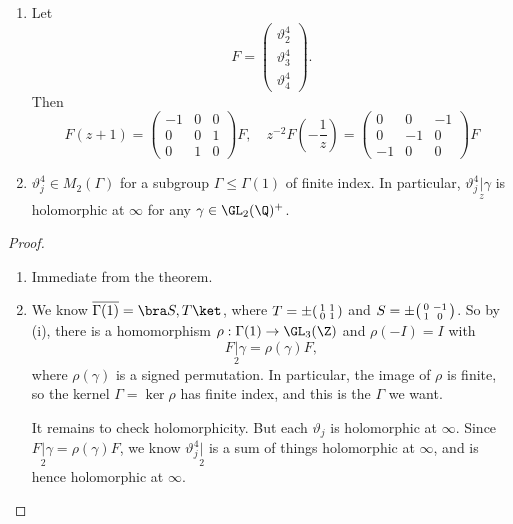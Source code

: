 \documentclass[a4paper]{article}
\begin{document}
\begin{cor}\leavevmode
  \begin{enumerate}
    \item Let
      \[
        F =
        \begin{pmatrix}
          \vartheta_2^4\\
          \vartheta_3^4\\
          \vartheta_4^4
        \end{pmatrix}.
      \]
      Then
      \[
        F(z + 1) =
        \begin{pmatrix}
           -1 & 0 & 0\\
           0 & 0 & 1\\
           0 & 1 & 0
         \end{pmatrix} F,\quad z^{-2} F\left(-\frac{1}{z}\right) =
         \begin{pmatrix}
           0 & 0 & -1\\
           0 & -1 & 0\\
           -1 & 0 & 0
         \end{pmatrix}F
      \]
    \item $\vartheta_j^4 \in M_2(\Gamma)$ for a subgroup $\Gamma \leq \Gamma(1)$ of finite index. In particular, $\vartheta_j^4 \underset{z}{|} \gamma$ is holomorphic at $\infty$ for any $\gamma \in \GL_2(\Q)^+$.
  \end{enumerate}
\end{cor}
\begin{proof}\leavevmode
  \begin{enumerate}
    \item Immediate from the theorem.
    \item We know $\overline{\Gamma(1)} = \bra S, T\ket$, where $T = \pm \begin{psmallmatrix}1 & 1\\0 & 1\end{psmallmatrix}$ and $S = \pm \begin{psmallmatrix}0 & -1\\1 & 0\end{psmallmatrix}$. So by (i), there is a homomorphism $\rho: \Gamma(1) \to \GL_3(\Z)$ and $\rho(-I) = I$ with
      \[
        F\underset{2}{|} \gamma = \rho(\gamma) F,
      \]
      where $\rho(\gamma)$ is a signed permutation. In particular, the image of $\rho$ is finite, so the kernel $\Gamma = \ker \rho$ has finite index, and this is the $\Gamma$ we want.

      It remains to check holomorphicity. But each $\vartheta_j$ is holomorphic at $\infty$. Since $F\underset{2}{|} \gamma= \rho (\gamma) F$, we know $\vartheta_j^4\underset{2}{|}$ is a sum of things holomorphic at $\infty$, and is hence holomorphic at $\infty$.
  \end{enumerate}
\end{proof}
\end{document}
